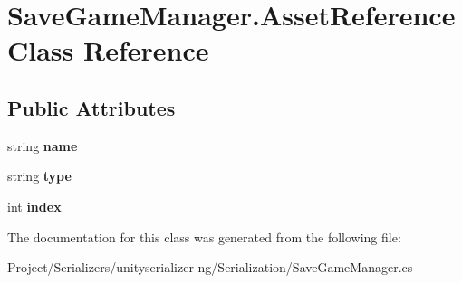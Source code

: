 \hypertarget{class_save_game_manager_1_1_asset_reference}{}\section{Save\+Game\+Manager.\+Asset\+Reference Class Reference}
\label{class_save_game_manager_1_1_asset_reference}
\subsection*{Public Attributes}
\begin{DoxyCompactItemize}
\item 
\mbox{\label{class_save_game_manager_1_1_asset_reference_a79781c3cdd4d102af7416a7ba6e22f36}} 
string {\bfseries name}
\item 
\mbox{\label{class_save_game_manager_1_1_asset_reference_a8576431a922c1ac4d860c29f1742de96}} 
string {\bfseries type}
\item 
\mbox{\label{class_save_game_manager_1_1_asset_reference_a39b6f20c7e4958cdb0257538a9d608fb}} 
int {\bfseries index}
\end{DoxyCompactItemize}


The documentation for this class was generated from the following file\+:\begin{DoxyCompactItemize}
\item 
Project/\+Serializers/unityserializer-\/ng/\+Serialization/Save\+Game\+Manager.\+cs\end{DoxyCompactItemize}
